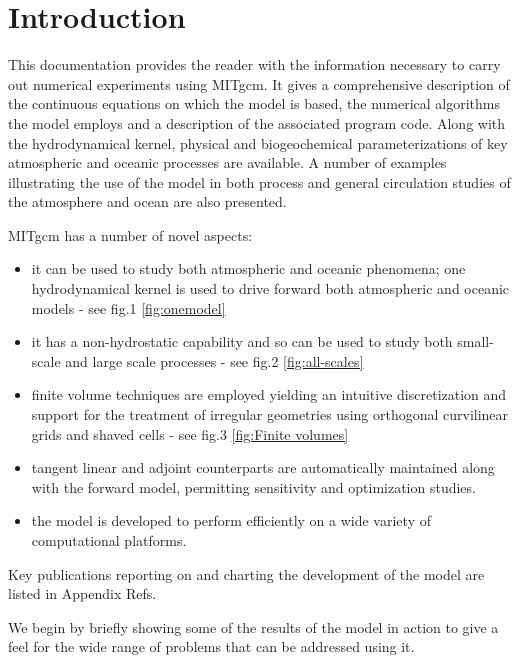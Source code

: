 
\section{Introduction}

This documentation provides the reader with the information necessary to
carry out numerical experiments using MITgcm. It gives a comprehensive
description of the continuous equations on which the model is based, the
numerical algorithms the model employs and a description of the associated
program code. Along with the hydrodynamical kernel, physical and
biogeochemical parameterizations of key atmospheric and oceanic processes
are available. A number of examples illustrating the use of the model in
both process and general circulation studies of the atmosphere and ocean are
also presented.

MITgcm has a number of novel aspects:

\begin{itemize}
\item  it can be used to study both atmospheric and oceanic phenomena; one
hydrodynamical kernel is used to drive forward both atmospheric and oceanic
models - see fig.1%
\ref{fig:onemodel}

\item  it has a non-hydrostatic capability and so can be used to study both
small-scale and large scale processes - see fig.2%
\ref{fig:all-scales}

\item  finite volume techniques are employed yielding an intuitive
discretization and support for the treatment of irregular geometries using
orthogonal curvilinear grids and shaved cells - see fig.3%
\ref{fig:Finite volumes}

\item  tangent linear and adjoint counterparts are automatically maintained
along with the forward model, permitting sensitivity and optimization
studies.

\item  the model is developed to perform efficiently on a wide variety of
computational platforms.
\end{itemize}

Key publications reporting on and charting the development of the model are
listed in Appendix Refs.

We begin by briefly showing some of the results of the model in action to
give a feel for the wide range of problems that can be addressed using it.
